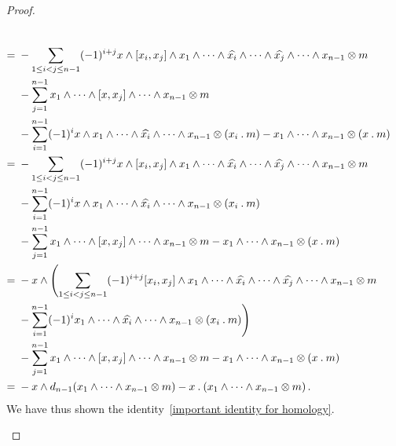 \begin{proof}
\begin{enumerate}
\begin{align*}
				\\
				={}&
				-
				\sum_{1 \leq i < j \leq n-1}
				(-1)^{i + j}
				x \wedge [x_i, x_j] \wedge x_1 \wedge \dotsb \wedge \widehat{x_i} \wedge \dotsb \wedge \widehat{x_j} \wedge \dotsb \wedge x_{n-1}
				\otimes m
				\\
				{}&
				-
				\sum_{j=1}^{n-1}
				x_1 \wedge \dotsb \wedge [x, x_j] \wedge \dotsb \wedge x_{n-1}
				\otimes m
				\\
				{}&
				-
				\sum_{i=1}^{n-1}
				(-1)^i
				x \wedge x_1 \wedge \dotsb \wedge \widehat{x_i} \wedge \dotsb \wedge x_{n-1} \otimes (x_i \mathbin{.} m)
				-
				x_1 \wedge \dotsb \wedge x_{n-1} \otimes (x \mathbin{.} m)
				\\
				={}&
				-
				\sum_{1 \leq i < j \leq n-1}
				(-1)^{i + j}
				x \wedge [x_i, x_j] \wedge x_1 \wedge \dotsb \wedge \widehat{x_i} \wedge \dotsb \wedge \widehat{x_j} \wedge \dotsb \wedge x_{n-1}
				\otimes m
				\\
				{}&
				-
				\sum_{i=1}^{n-1}
				(-1)^i
				x \wedge x_1 \wedge \dotsb \wedge \widehat{x_i} \wedge \dotsb \wedge x_{n-1} \otimes (x_i \mathbin{.} m)
				\\
				{}&
				-
				\sum_{j=1}^{n-1}
				x_1 \wedge \dotsb \wedge [x, x_j] \wedge \dotsb \wedge x_{n-1}
				\otimes m
				-
				x_1 \wedge \dotsb \wedge x_{n-1} \otimes (x \mathbin{.} m)
				\\
				={}&
				-
				x \wedge
				\Biggl(
				\sum_{1 \leq i < j \leq n-1}
				(-1)^{i + j}
				[x_i, x_j] \wedge x_1 \wedge \dotsb \wedge \widehat{x_i} \wedge \dotsb \wedge \widehat{x_j} \wedge \dotsb \wedge x_{n-1}
				\otimes m
				\\
				{}&
				-
				\sum_{i=1}^{n-1}
				(-1)^i
				x_1 \wedge \dotsb \wedge \widehat{x_i} \wedge \dotsb \wedge x_{n-1} \otimes (x_i \mathbin{.} m)
				\Biggr)
				\\
				{}&
				-
				\sum_{j=1}^{n-1}
				x_1 \wedge \dotsb \wedge [x, x_j] \wedge \dotsb \wedge x_{n-1}
				\otimes m
				-
				x_1 \wedge \dotsb \wedge x_{n-1} \otimes (x \mathbin{.} m)
				\\
				={}&
				- x \wedge d_{n-1}(x_1 \wedge \dotsb \wedge x_{n-1} \otimes m)
				- x \mathbin{.} (x_1 \wedge \dotsb \wedge x_{n-1} \otimes m) \,.
			\end{align*}
			\endgroup
			We have thus shown the identity~\eqref{important identity for homology}.


\end{enumerate}
\end{proof}
